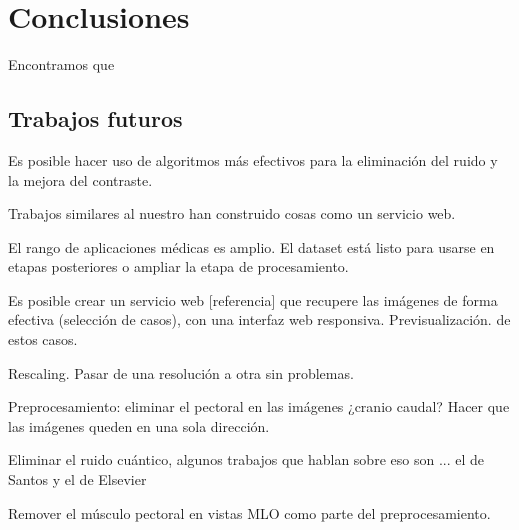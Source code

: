 \chapter{Conclusiones}
\label{conclusiones}

Encontramos que 

\section{Trabajos futuros}

Es posible hacer uso de algoritmos más efectivos para la eliminación del ruido y
la mejora del contraste. 

Trabajos similares al nuestro \cite{heath2000digital} han construido cosas como
un servicio web.

El rango de aplicaciones médicas es amplio. El dataset está listo para usarse
en etapas posteriores o ampliar la etapa de procesamiento.

Es posible crear un servicio web [referencia] que recupere las imágenes de
forma efectiva (selección de casos), con una interfaz web responsiva.
Previsualización. de estos casos.

Rescaling. Pasar de una resolución a otra sin problemas.

Preprocesamiento: eliminar el pectoral en las imágenes ¿cranio caudal?
Hacer que las imágenes queden en una sola dirección.

Eliminar el ruido cuántico, algunos trabajos que hablan sobre eso son ... el de
Santos y el de Elsevier

Remover el músculo pectoral en vistas MLO como parte del preprocesamiento.
